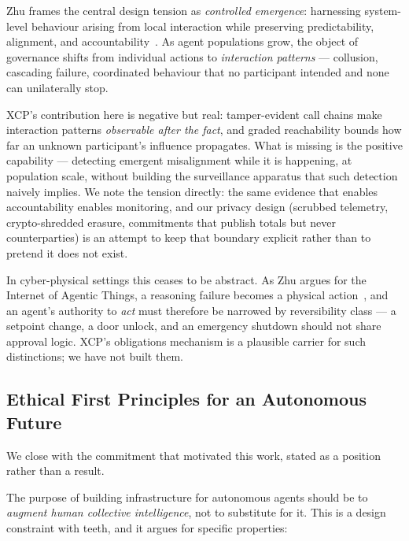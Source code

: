\documentclass[11pt]{article}
\begin{document}
Zhu frames the central design tension as \emph{controlled emergence}: harnessing
system-level behaviour arising from local interaction while preserving
predictability, alignment, and accountability~\cite{zhu2026ioai}. As agent
populations grow, the object of governance shifts from individual actions to
\emph{interaction patterns} --- collusion, cascading failure, coordinated
behaviour that no participant intended and none can unilaterally stop.

XCP's contribution here is negative but real: tamper-evident call chains make
interaction patterns \emph{observable after the fact}, and graded reachability
bounds how far an unknown participant's influence propagates. What is missing is
the positive capability --- detecting emergent misalignment while it is
happening, at population scale, without building the surveillance apparatus that
such detection naively implies. We note the tension directly: the same evidence
that enables accountability enables monitoring, and our privacy design (scrubbed
telemetry, crypto-shredded erasure, commitments that publish totals but never
counterparties) is an attempt to keep that boundary explicit rather than to
pretend it does not exist.

In cyber-physical settings this ceases to be abstract. As Zhu argues for the
Internet of Agentic Things, a reasoning failure becomes a physical
action~\cite{zhu2026ioat}, and an agent's authority to \emph{act} must therefore
be narrowed by reversibility class --- a setpoint change, a door unlock, and an
emergency shutdown should not share approval logic. XCP's obligations mechanism
is a plausible carrier for such distinctions; we have not built them.

\subsection{Ethical First Principles for an Autonomous Future}

We close with the commitment that motivated this work, stated as a position
rather than a result.

The purpose of building infrastructure for autonomous agents should be to
\emph{augment human collective intelligence}, not to substitute for it. This is a
design constraint with teeth, and it argues for specific properties:
\end{document}
